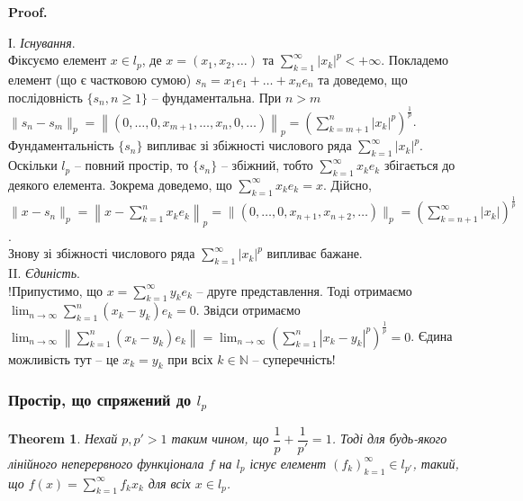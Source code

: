 \documentclass[a4paper, 10pt]{article}
\makeatletter
\theoremstyle{theoremdd}
\newtheorem{theorem}{Theorem}[subsection]
\theoremstyle{theoremdd}
\theoremstyle{theoremdd}
\theoremstyle{theoremdd}
\theoremstyle{theoremdd}
\theoremstyle{theoremdd}
\theoremstyle{theoremdd}
\theoremstyle{theoremdd}
\renewenvironment{proof}[1][Proof.\\]{\par
\pushQED{\hfill \qed}%
\normalfont \topsep6\p@\@plus6\p@\relax
\trivlist
\item\relax
{\bfseries
#1\@addpunct{.}}\hspace\labelsep\ignorespaces
}{%
\popQED\endtrivlist\@endpefalse
}
\makeatother
\begin{document}
\begin{proof}
І. \textit{Існування}.\\
Фіксуємо елемент $x \in l_p$, де $x = (x_1,x_2,\dots)$ та $\displaystyle\sum_{k=1}^\infty |x_k|^p < +\infty$. Покладемо елемент (що є частковою сумою) $s_n = x_1 e_1 + \dots + x_n e_n$ та доведемо, що послідовність $\{s_n, n \geq 1\}$ -- фундаментальна. При $n > m$\\
$\|s_n - s_m \|_p = \left\| (0,\dots,0,x_{m+1},\dots,x_n,0,\dots ) \right\|_p = \displaystyle \left( \sum_{k=m+1}^n |x_k|^p \right)^{\frac{1}{p}}$.\\
Фундаментальність $\{s_n\}$ випливає зі збіжності числового ряда $\displaystyle\sum_{k=1}^\infty |x_k|^p$. Оскільки $l_p$ -- повний простір, то $\{s_n\}$ -- збіжний, тобто $\displaystyle\sum_{k=1}^\infty x_k e_k$ збігається до деякого елемента. Зокрема доведемо, що $\displaystyle\sum_{k=1}^\infty x_k e_k = x$. Дійсно,\\
$\|x-s_n\|_p = \displaystyle \left\| x - \sum_{k=1}^n x_k e_k \right\|_p = \| (0,\dots,0,x_{n+1},x_{n+2},\dots)\|_p = \left( \sum_{k=n+1}^\infty |x_k| \right)^{\frac{1}{p}}$.\\
Знову зі збіжності числового ряда $\displaystyle\sum_{k=1}^\infty |x_k|^p$ випливає бажане.
\bigskip \\
II. \textit{Єдиність}.\\
!Припустимо, що $x = \displaystyle\sum_{k=1}^\infty y_k e_k$ -- друге представлення. Тоді отримаємо $\displaystyle\lim_{n \to \infty} \sum_{k=1}^n (x_k-y_k)e_k = 0$. Звідси отримаємо $\displaystyle\lim_{n \to \infty}\left\| \sum_{k=1}^n (x_k-y_k) e_k \right\| = \lim_{n \to \infty} \left(\sum_{k=1}^n |x_k-y_k|^p\right)^{\frac{1}{p}} = 0$. Єдина можливість тут -- це $x_k = y_k$ при всіх $k \in \mathbb{N}$ -- суперечність!
\end{proof}

\subsubsection{Простір, що спряжений до $l_p$}
\begin{theorem}
Нехай $p,p' > 1$ таким чином, що $\dfrac{1}{p} + \dfrac{1}{p'} = 1$. Тоді для будь-якого лінійного неперервного функціонала $f$ на $l_p$ існує елемент $(f_k)_{k=1}^\infty \in l_{p'}$, такий, що $f(x) = \displaystyle\sum_{k=1}^\infty f_k x_k$ для всіх $x \in l_p$.
\end{theorem}
\end{document}
